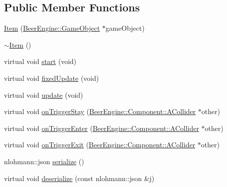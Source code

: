 \subsection*{Public Member Functions}
\begin{DoxyCompactItemize}
\item 
\mbox{\hyperlink{class_game_1_1_component_1_1_item_a55d47753d2ea3338e02453a2aeab78ff}{Item}} (\mbox{\hyperlink{class_beer_engine_1_1_game_object}{Beer\+Engine\+::\+Game\+Object}} $\ast$game\+Object)
\item 
\mbox{\hyperlink{class_game_1_1_component_1_1_item_a1ffc774ac5086f6f918d913f70e0322f}{$\sim$\+Item}} ()
\item 
virtual void \mbox{\hyperlink{class_game_1_1_component_1_1_item_a69276f0e6bbd44144a5618cfe89f526a}{start}} (void)
\item 
virtual void \mbox{\hyperlink{class_game_1_1_component_1_1_item_a3402bfd1509d12eb16fadbc37222406d}{fixed\+Update}} (void)
\item 
virtual void \mbox{\hyperlink{class_game_1_1_component_1_1_item_ac4e5deede6846817d6c818f8c8404fdc}{update}} (void)
\item 
virtual void \mbox{\hyperlink{class_game_1_1_component_1_1_item_a02230f3771a83e4a77035cb0ec4c04be}{on\+Trigger\+Stay}} (\mbox{\hyperlink{class_beer_engine_1_1_component_1_1_a_collider}{Beer\+Engine\+::\+Component\+::\+A\+Collider}} $\ast$other)
\item 
virtual void \mbox{\hyperlink{class_game_1_1_component_1_1_item_ae5369b261c5d6212de4b3f21ce02c672}{on\+Trigger\+Enter}} (\mbox{\hyperlink{class_beer_engine_1_1_component_1_1_a_collider}{Beer\+Engine\+::\+Component\+::\+A\+Collider}} $\ast$other)
\item 
virtual void \mbox{\hyperlink{class_game_1_1_component_1_1_item_a33c72fb48b46ce7b67b924472d0f3456}{on\+Trigger\+Exit}} (\mbox{\hyperlink{class_beer_engine_1_1_component_1_1_a_collider}{Beer\+Engine\+::\+Component\+::\+A\+Collider}} $\ast$other)
\item 
nlohmann\+::json \mbox{\hyperlink{class_game_1_1_component_1_1_item_a8aae88fd10b852e81fbaa16b5912a4ab}{serialize}} ()
\item 
virtual void \mbox{\hyperlink{class_game_1_1_component_1_1_item_a3a9cb5ba936a644f23976d9c9e9bbdce}{deserialize}} (const nlohmann\+::json \&j)
\end{DoxyCompactItemize}

